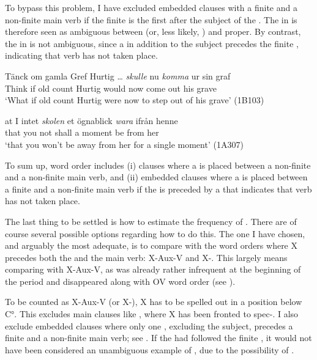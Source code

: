 \documentclass[output=paper, colorlinks, citecolor=brown]{langscibook}
\begin{document}
To bypass this problem, I have excluded embedded clauses with a finite  and a non-finite main verb if the finite  is the first  after the subject of the . The  in  is therefore seen as ambiguous between  (or, less likely, ) and  proper. By contrast, the  in  is not ambiguous, since a  in addition to the subject precedes the finite , indicating that verb  has not taken place.


\ea
\label{ex:sangfelt:24}
\ea\label{ex:sangfelt:24a}
\gll Tänck om gamla Gref {Hurtig …} \textit{skulle} {nu} \textit{komma} ur sin graf \\ %
 Think if old count Hurtig would now come out his grave\\
\glt ‘What if old count Hurtig were now to step out of his grave’ (1B103)

\ex\label{ex:sangfelt:24b}
\gll at I {intet} \textit{skolen} {et} {ögnablick} \textit{wara} ifrån henne \\
 that you not shall a moment be from her\\
\glt ‘that you won’t be away from her for a single moment’ (1A307)
\z
\z


To sum up,  word order includes (i) clauses where a  is placed between a non-finite  and a non-finite main verb, and (ii) embedded clauses where a  is placed between a finite  and a non-finite main verb if the  is preceded by a  that indicates that verb  has not taken place.


The last thing to be settled is how to estimate the frequency of . There are of course several possible options regarding how to do this. The one I have chosen, and arguably the most adequate, is to compare  with the word orders where X precedes both the  and the main verb: X-Aux-V and X-. This largely means comparing  with X-Aux-V, as  was already rather infrequent at the beginning of the  period and disappeared along with OV word order (see \citealt{Platzack1983,Petzell2011,Sangfelt2019}).



To be counted as X-Aux-V (or X-), X has to be spelled out in a position below C°. This excludes main clauses like , where X has been fronted to spec-. I also exclude embedded clauses where only one , excluding the subject, precedes a finite  and a non-finite main verb; see . If the  had followed the finite , it would not have been considered an unambiguous example of , due to the possibility of .
\end{document}
